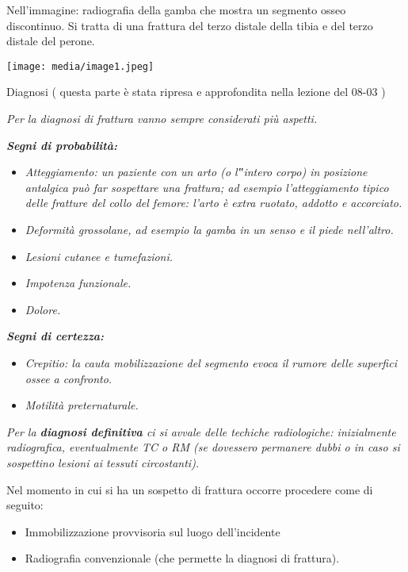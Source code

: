 \documentclass[]{article}
\begin{document}
Nell'immagine: radiografia della gamba che mostra un segmento osseo
discontinuo. Si tratta di una frattura del terzo distale della tibia e
del terzo distale del perone.

\texttt{[image: media/image1.jpeg]}

Diagnosi ( questa parte è stata ripresa e approfondita nella lezione del
08-03 )

\emph{Per la diagnosi di frattura vanno sempre considerati più aspetti.}

\emph{\textbf{Segni di probabilità:}}

\begin{itemize}
\item
  \emph{Atteggiamento: un paziente con un arto (o l‟intero corpo) in
  posizione antalgica può far sospettare una frattura; ad esempio
  l'atteggiamento tipico delle fratture del collo del femore: l'arto è
  extra ruotato, addotto e accorciato.}
\item
  \emph{Deformità grossolane, ad esempio la gamba in un senso e il piede
  nell'altro.}
\item
  \emph{Lesioni cutanee e tumefazioni.}
\item
  \emph{Impotenza funzionale.}
\item
  \emph{Dolore.}
\end{itemize}

\emph{\textbf{Segni di certezza:}}

\begin{itemize}
\item
  \emph{Crepitio: la cauta mobilizzazione del segmento evoca il rumore
  delle superfici ossee a confronto.}
\item
  \emph{Motilità preternaturale.}
\end{itemize}

\emph{Per la \textbf{diagnosi definitiva} ci si avvale delle techiche
radiologiche: inizialmente radiografica, eventualmente TC o RM (se
dovessero permanere dubbi o in caso si sospettino lesioni ai tessuti
circostanti).}

Nel momento in cui si ha un sospetto di frattura occorre procedere come
di seguito:

\begin{itemize}
\item
  Immobilizzazione provvisoria sul luogo dell'incidente
\item
  Radiografia convenzionale (che permette la diagnosi di frattura).
\end{itemize}
\end{document}
